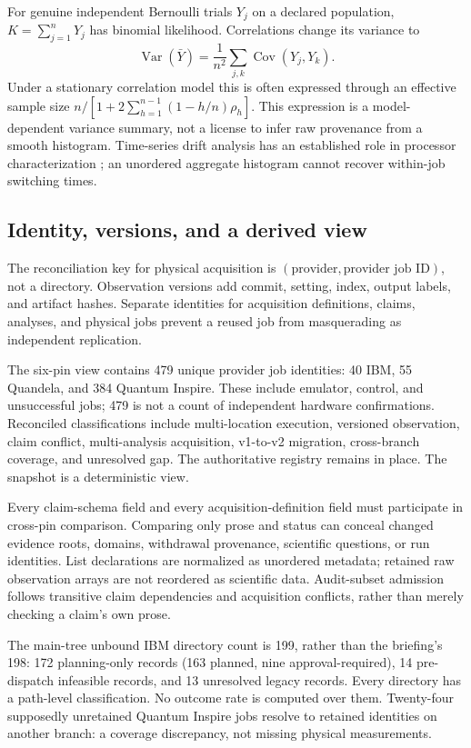 \documentclass[11pt,a4paper]{article}
\begin{document}
For genuine independent Bernoulli trials $Y_j$ on a declared population, $K=\sum_{j=1}^nY_j$ has binomial likelihood. Correlations change its variance to
\begin{equation}
\operatorname{Var}(\bar Y)=\frac1{n^2}\sum_{j,k}\operatorname{Cov}(Y_j,Y_k).
\end{equation}
Under a stationary correlation model this is often expressed through an effective sample size $n/[1+2\sum_{h=1}^{n-1}(1-h/n)\rho_h]$. This expression is a model-dependent variance summary, not a license to infer raw provenance from a smooth histogram. Time-series drift analysis has an established role in processor characterization \cite{drift}; an unordered aggregate histogram cannot recover within-job switching times.

\subsection{Identity, versions, and a derived view}
The reconciliation key for physical acquisition is $(\text{provider},\text{provider job ID})$, not a directory. Observation versions add commit, setting, index, output labels, and artifact hashes. Separate identities for acquisition definitions, claims, analyses, and physical jobs prevent a reused job from masquerading as independent replication.

The six-pin view contains 479 unique provider job identities: 40 IBM, 55 Quandela, and 384 Quantum Inspire. These include emulator, control, and unsuccessful jobs; 479 is not a count of independent hardware confirmations. Reconciled classifications include multi-location execution, versioned observation, claim conflict, multi-analysis acquisition, v1-to-v2 migration, cross-branch coverage, and unresolved gap. The authoritative registry remains in place. The snapshot is a deterministic view.

Every claim-schema field and every acquisition-definition field must participate in cross-pin comparison. Comparing only prose and status can conceal changed evidence roots, domains, withdrawal provenance, scientific questions, or run identities. List declarations are normalized as unordered metadata; retained raw observation arrays are not reordered as scientific data. Audit-subset admission follows transitive claim dependencies and acquisition conflicts, rather than merely checking a claim's own prose.

The main-tree unbound IBM directory count is 199, rather than the briefing's 198: 172 planning-only records (163 planned, nine approval-required), 14 pre-dispatch infeasible records, and 13 unresolved legacy records. Every directory has a path-level classification. No outcome rate is computed over them. Twenty-four supposedly unretained Quantum Inspire jobs resolve to retained identities on another branch: a coverage discrepancy, not missing physical measurements.
\end{document}

